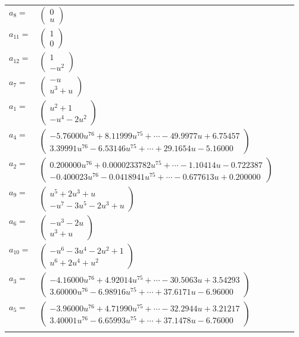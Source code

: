 \documentclass[1p]{elsarticle_modified}
\theoremstyle{definition}
\begin{document}
\begin{tabular}{m{7pt} m{180pt} m{7pt} m{180pt} }
\flushright $a_{8}=$&$\begin{pmatrix}0\\u\end{pmatrix}$ \\
\flushright $a_{11}=$&$\begin{pmatrix}1\\0\end{pmatrix}$ \\
\flushright $a_{12}=$&$\begin{pmatrix}1\\- u^2\end{pmatrix}$ \\
\flushright $a_{7}=$&$\begin{pmatrix}- u\\u^3+u\end{pmatrix}$ \\
\flushright $a_{1}=$&$\begin{pmatrix}u^2+1\\- u^4-2 u^2\end{pmatrix}$ \\
\flushright $a_{4}=$&$\begin{pmatrix}-5.76000 u^{76}+8.11999 u^{75}+\cdots-49.9977 u+6.75457\\3.39991 u^{76}-6.53146 u^{75}+\cdots+29.1654 u-5.16000\end{pmatrix}$ \\
\flushright $a_{2}=$&$\begin{pmatrix}0.200000 u^{76}+0.0000233782 u^{75}+\cdots-1.10414 u-0.722387\\-0.400023 u^{76}-0.0418941 u^{75}+\cdots-0.677613 u+0.200000\end{pmatrix}$ \\
\flushright $a_{9}=$&$\begin{pmatrix}u^5+2 u^3+u\\- u^7-3 u^5-2 u^3+u\end{pmatrix}$ \\
\flushright $a_{6}=$&$\begin{pmatrix}- u^3-2 u\\u^3+u\end{pmatrix}$ \\
\flushright $a_{10}=$&$\begin{pmatrix}- u^6-3 u^4-2 u^2+1\\u^6+2 u^4+u^2\end{pmatrix}$ \\
\flushright $a_{3}=$&$\begin{pmatrix}-4.16000 u^{76}+4.92014 u^{75}+\cdots-30.5063 u+3.54293\\3.60000 u^{76}-6.98916 u^{75}+\cdots+37.6171 u-6.96000\end{pmatrix}$ \\
\flushright $a_{5}=$&$\begin{pmatrix}-3.96000 u^{76}+4.71990 u^{75}+\cdots-32.2944 u+3.21217\\3.40001 u^{76}-6.65993 u^{75}+\cdots+37.1478 u-6.76000\end{pmatrix}$\\&\end{tabular}
\end{document}
